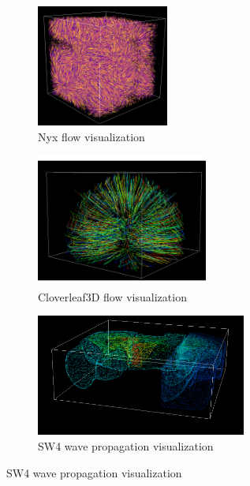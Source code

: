 \begin{figure}[ht]
\centering
\begin{subfigure}{0.27\textwidth}
\centering
\includegraphics[height=4cm, keepaspectratio]{images/pathlines_nyx.png}
\caption{Nyx flow visualization}
\label{fig:pathlines_nyx}
\end{subfigure}
\hspace{-5mm}
\begin{subfigure}{0.32\textwidth}
\centering
\includegraphics[height=4.36cm, keepaspectratio]{images/pathlines_clover.pdf}
\caption{Cloverleaf3D flow visualization}
\label{fig:pathlines_clover}
\end{subfigure}
\hspace{-5mm}
\begin{subfigure}{0.41\textwidth}
\centering
\includegraphics[height=4cm, keepaspectratio]{images/sw4_vis_2.png}
\caption{SW4 wave propagation visualization}
\label{fig:sw4_vis}
\end{subfigure}
\end{figure}
